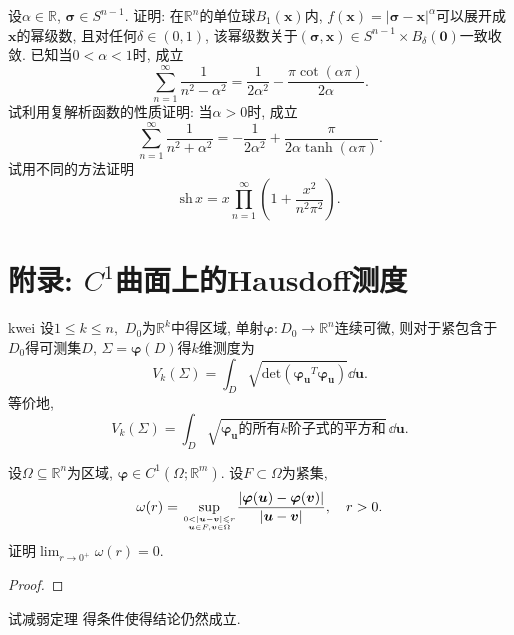 \begin{quizb}
\woe 设\(\alpha\in\mathbb{R}\), \(\boldsymbol{\sigma}\in S^{n-1}\). 证明: 在\(\mathbb{R}^n\)的单位球\(B_1(\boldsymbol{x})\)内, \(f(\boldsymbol{x})=|\boldsymbol{\sigma}-\boldsymbol{x}|^\alpha\)可以展开成\(\boldsymbol{x}\)的幂级数, 且对任何\(\delta\in(0,1)\), 该幂级数关于\((\boldsymbol{\sigma},\boldsymbol{x})\in S^{n-1}\times B_{\delta}(\boldsymbol{0})\)一致收敛.
\woe 已知当\(0<\alpha<1\)时, 成立\[\sum_{n=1}^{\infty}\frac{1}{n^2-\alpha^2}=\frac{1}{2\alpha^2}-\frac{\pi\cot (\alpha\pi)}{2\alpha}.\]试利用复解析函数的性质证明: 当\(\alpha>0\)时, 成立\[\sum_{n=1}^{\infty}\frac{1}{n^2+\alpha^2}=-\frac{1}{2\alpha^2}+\frac{\pi}{2\alpha\tanh(\alpha\pi)}.\]
\woe 试用不同的方法证明\[\mathrm{sh}\, x=x\prod_{n=1}^{\infty}\left(1+\frac{x^2}{n^2\pi^2}\right).\]
\end{quizb}
\section{附录: \texorpdfstring{\(C^1\)}{}曲面上的Hausdoff测度}
\begin{theorem}{}{kwei}
设\(1\leqslant k\leqslant n,\) \(D_0\)为\(\mathbb{R}^k\)中得区域, 单射\(\boldsymbol{\varphi}:D_0\rightarrow\mathbb{R}^n\)连续可微, 则对于紧包含于\(D_0\)得可测集\(D,\,\varSigma=\boldsymbol{\varphi}(D)\)得\(k\)维测度为\[V_k(\varSigma)=\int_D\sqrt{\mathrm{det}\left(\boldsymbol{\varphi_u}^T\boldsymbol{\varphi_u}\right)}\dd\boldsymbol{u}.\]等价地,\[V_k(\varSigma)=\int_D\sqrt{\boldsymbol{\varphi_u}\text{的所有}k\text{阶子式的平方和}}\,\dd\boldsymbol{u}.\]
\end{theorem}

\begin{quiza}
\woe 设\(\Omega\subseteq\mathbb{R}^n\)为区域, \(\boldsymbol{\varphi}\in C^1\left(\varOmega;\mathbb{R}^m\right)\). 设\(F\subset \Omega\)为紧集,\[\omega(r)=\underset{0<|\boldsymbol{u}-\boldsymbol{v}|\leqslant r\atop\boldsymbol{u}\in F,\boldsymbol{v}\in\Omega}{\mathrm{sup}}\frac{\left|\boldsymbol{\varphi}(\boldsymbol{u})-\boldsymbol{\varphi}(\boldsymbol{v})\right|}{|\boldsymbol{u}-\boldsymbol{v}|},\quad r>0.\]证明\(\lim_{r\rightarrow 0^+}\omega(r)=0.\)
\begin{proof}

\end{proof}
\end{quiza}
\begin{quizb}
\woe 试减弱定理 得条件使得结论仍然成立.
\begin{solution}

\end{solution}
\end{quizb}